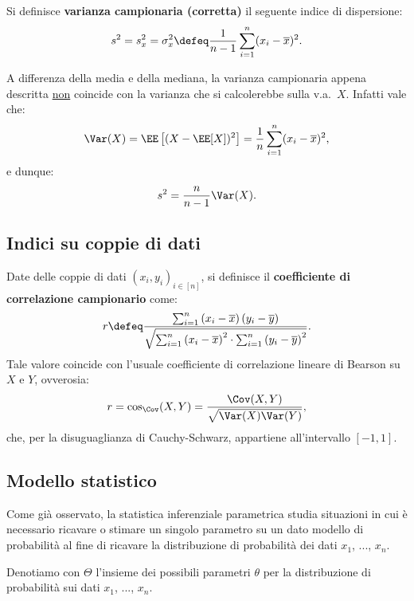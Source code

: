 \begin{multicols*}{2}
\begin{definition}
    Si definisce \textbf{varianza campionaria (corretta)} il seguente
    indice di dispersione:
    \[
        s^2 = s_x^2 = \sigma_x^2 \defeq \frac{1}{n-1} \sum_{i=1}^n (x_i - \overline{x})^2.
    \]
\end{definition}

\begin{warn}
    A differenza della media e della mediana, la varianza campionaria appena
    descritta \underline{non} coincide con la varianza che si calcolerebbe
    sulla v.a.~$X$. Infatti vale che:
    \[
        \Var(X) = \EE\left[(X - \EE[X])^2\right] = \frac{1}{n} \sum_{i=1}^n (x_i - \overline{x})^2,
    \]
    e dunque:
    \[
        s^2 = \frac{n}{n-1} \Var(X).
    \]
\end{warn}

\subsection{Indici su coppie di dati}

\begin{definition}
    Date delle coppie di dati $(x_i, y_i)_{i \in [n]}$, si definisce
    il \textbf{coefficiente di correlazione campionario} come:
    \[
        r \defeq \frac{\sum_{i=1}^n \left(x_i - \overline{x}\right)\left(y_i - \overline{y}\right)}{\sqrt{\sum_{i=1}^n \left(x_i - \overline{x}\right)^2 \cdot \sum_{i=1}^n \left(y_i - \overline{y}\right)^2}}.
    \]
    Tale valore coincide con l'usuale coefficiente di correlazione lineare di Bearson su
    $X$ e $Y$, ovverosia:
    \[
        r = \cos_{\Cov}(X, Y) = \frac{\Cov(X, Y)}{\sqrt{\Var(X) \Var(Y)}},
    \]
    che, per la disuguaglianza di Cauchy-Schwarz, appartiene all'intervallo $[-1, 1]$.
\end{definition}

\subsection{Modello statistico}

Come già osservato, la statistica inferenziale parametrica studia situazioni in cui
è necessario ricavare o stimare un singolo parametro su un dato modello di probabilità al fine
di ricavare la distribuzione di probabilità dei dati $x_1$, ..., $x_n$.

\begin{notation}
    Denotiamo con $\Theta$ l'insieme dei possibili parametri $\theta$ per la distribuzione
    di probabilità sui dati $x_1$, ..., $x_n$. \smallskip


\end{notation}
\end{multicols*}
